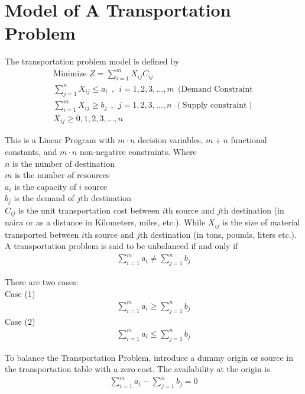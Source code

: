 \documentclass[12pt]{report}
\newcommand{\sps}{\\[0.2cm]}
\newcommand{\NI}{\noindent}
\newcommand{\tp}{Transportation Problem }
\newcommand{\stp}{transportation problem }
\begin{document}
		\section{Model of A \tp}
	The \stp model is defined by
	\begin{gather}
		\text{Minimize } Z = \sum_{i=1}^{m}X_{ij}C_{ij}\label{eq:3_1}\sps
		\sum_{j=1}^{n}X_{ij} \leq a_i~~,~~ i=1,2,3,\ldots,m~~ (\text{Demand Constraint}\label{eq:3_2}\sps
		\sum_{i=1}^{m}X_{ij} \geq b_j~~,~~ j=1,2,3,\ldots,n~~ (\text{Supply constraint})\label{eq:3_3}\sps
		X_{ij} \geq 0,1,2,3,\ldots,n\label{eq:3_4}
	\end{gather}
	
	\NI This is a Linear Program with $m\cdot n$ decision variables, $m+n$ functional constants, and $m\cdot n$ non-negative constraints. Where\sps
	$n$ is the number of destination\\
	$m$ is the number of resources\\
	$a_i$ is the capacity of $i$ source\\
	$b_j$ is the demand of $j$th destination\\
	$C_{ij}$ is the unit transportation cost between $i$th source and $j$th destination (in naira or as a distance in Kilometers, miles, etc.). While $X_{ij}$ is the size of material transported between $i$th source and $j$th destination (in tons, pounds, liters etc.).\sps
	
	\NI A \stp is said to be unbalanced if and only if
	\begin{eqnarray}
		\sum_{i=1}^{m}a_i \neq \sum_{j=1}^{n}b_j\label{eq:3_5}
	\end{eqnarray} 
	
	\NI There are two cases:\\
	Case (1)
	\begin{eqnarray}
		\sum_{i=1}^{m}a_i \geq \sum_{j=1}^{n}b_j\label{eq:3_6}
	\end{eqnarray}
	Case (2)
	\begin{eqnarray}
		\sum_{i=1}^{m}a_i \leq \sum_{j=1}^{n}b_j\label{eq:3_7}
	\end{eqnarray}
	
	\NI To balance the Transportation Problem, introduce a dummy origin or source in the transportation table with a zero cost. The availability at the origin is
	\begin{eqnarray}
		\sum_{i=1}^{m}a_i - \sum_{j=1}^{n}b_j = 0 \label{eq:3_8}
	\end{eqnarray}
\end{document}
